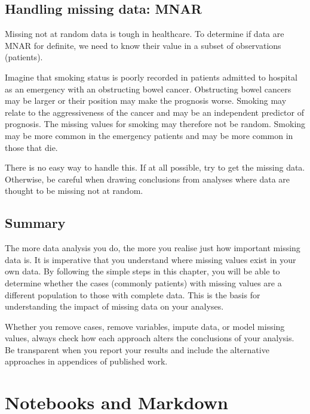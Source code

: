 \documentclass[
  12pt,
  krantz2]{krantz}
\begin{document}
\hypertarget{handling-missing-data-mnar}{%
\section{Handling missing data: MNAR}\label{handling-missing-data-mnar}}

Missing not at random data is tough in healthcare.
To determine if data are MNAR for definite, we need to know their value in a subset of observations (patients).

Imagine that smoking status is poorly recorded in patients admitted to hospital as an emergency with an obstructing bowel cancer.
Obstructing bowel cancers may be larger or their position may make the prognosis worse.
Smoking may relate to the aggressiveness of the cancer and may be an independent predictor of prognosis.
The missing values for smoking may therefore not be random.
Smoking may be more common in the emergency patients and may be more common in those that die.

There is no easy way to handle this.
If at all possible, try to get the missing data.
Otherwise, be careful when drawing conclusions from analyses where data are thought to be missing not at random.

\hypertarget{summary-3}{%
\section{Summary}\label{summary-3}}

The more data analysis you do, the more you realise just how important missing data is.
It is imperative that you understand where missing values exist in your own data.
By following the simple steps in this chapter, you will be able to determine whether the cases (commonly patients) with missing values are a different population to those with complete data.
This is the basis for understanding the impact of missing data on your analyses.

Whether you remove cases, remove variables, impute data, or model missing values, always check how each approach alters the conclusions of your analysis.
Be transparent when you report your results and include the alternative approaches in appendices of published work.

\hypertarget{chap12-h1}{%
\chapter{Notebooks and Markdown}\label{chap12-h1}}
\end{document}
